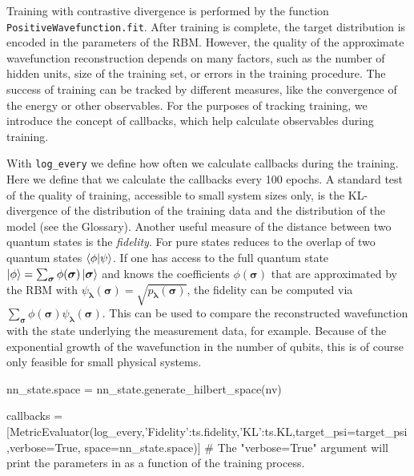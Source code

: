 \documentclass[submission, Phys]{SciPost}
\begin{document}
Training with contrastive divergence is performed by the function \verb|PositiveWavefunction.fit|.  After training is complete, the target distribution is encoded in the 
parameters of the RBM.  However, the quality of the approximate wavefunction reconstruction depends on many factors, such as the number of hidden units, size of the training set, or errors in the training procedure.  
The success of training can be tracked by different measures, like the convergence of the energy or other observables.
For the purposes of tracking training, we introduce the concept of callbacks, which help calculate observables during training.


With \verb|log_every| we define how often we calculate callbacks during the training. Here we define that we calculate the callbacks every 100 epochs.  
A standard test of the quality of training, accessible to small system sizes only, 
is the KL-divergence of the distribution of the training data and the distribution of the model (see the Glossary).
Another useful measure of the distance between two quantum states is the {\it fidelity}.
For pure states reduces to the overlap of two quantum states $\braket{\phi | \psi}$.
If one has access to the full quantum state $\ket{\phi} = \sum_{\bm{\sigma}} \phi(\bm{\sigma}) \ket{ \bm{\sigma}}$
and knows the coefficients $\phi(\bm{\sigma})$ that are approximated by the RBM with
$\psi_{\bm{\lambda}}(\bm{\sigma}) = \sqrt{p_{\bm{\lambda}}(\bm{\sigma})}$,
the fidelity can be computed via $\sum_{\bm{\sigma}} \phi(\bm{\sigma}) \psi_{\bm{\lambda}}(\bm{\sigma})$.
This can be used to compare the reconstructed wavefunction with the state underlying the measurement data, for example.
Because of the exponential growth of the wavefunction in the number of qubits, this is of course only feasible for small physical systems.

\begin{python}
nn_state.space = nn_state.generate_hilbert_space(nv)

callbacks = [MetricEvaluator(log_every,{'Fidelity':ts.fidelity,'KL':ts.KL},target_psi=target_psi,verbose=True, 
                             space=nn_state.space)]
# The "verbose=True" argument will print the parameters in { } as a function of the training process.
\end{python}
\end{document}
